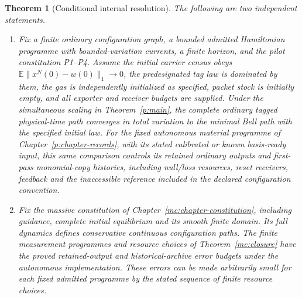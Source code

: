 \documentclass[11pt,oneside,openany]{book}
\newtheorem{theorem}{Theorem}[chapter]
\theoremstyle{definition}
\theoremstyle{remark}\newtheorem{remark}[theorem]{Remark}
\begin{document}
\begin{theorem}[Conditional internal resolution]\label{syn:resolution}
The following are two independent statements.
\begin{enumerate}
\item Fix a finite ordinary configuration graph, a bounded admitted
Hamiltonian programme with bounded-variation currents, a finite horizon,
and the pilot constitution P1--P4. Assume the initial carrier census obeys
$\mathbb E\|x^N(0)-w(0)\|_1\to0$, the predesignated tag law is dominated by
them, the gas is independently initialized as specified, packet stock is
initially empty, and all exporter and receiver budgets are supplied.
Under the simultaneous scaling in Theorem~\ref{p:main}, the complete
ordinary tagged physical-time path converges in total variation to the
minimal Bell path with the specified initial law. For the fixed
autonomous material programme of Chapter~\ref{p:chapter-records}, with
its stated calibrated or known basis-ready input, this same comparison
controls its retained ordinary outputs and first-pass monomial-copy
histories, including null/loss resources, reset receivers, feedback and
the inaccessible reference included in the declared configuration
convention.
\item Fix the massive constitution of
Chapter~\ref{mc:chapter-constitution}, including guidance, complete
initial equilibrium and its smooth finite domain. Its full dynamics
defines conservative continuous configuration paths. The finite
measurement programmes and resource choices of
Theorem~\ref{mc:closure} have the proved retained-output and
historical-archive error budgets under the autonomous implementation.
These errors can be made arbitrarily small for each fixed admitted
programme by the stated sequence of finite resource choices.
\end{enumerate}
\end{theorem}
\end{document}
